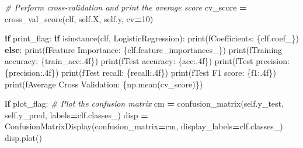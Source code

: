 \documentclass[
]{book}
\newenvironment{Shaded}{\begin{snugshade}}{\end{snugshade}}
\newcommand{\BuiltInTok}[1]{#1}
\newcommand{\CommentTok}[1]{\textcolor[rgb]{0.56,0.35,0.01}{\textit{#1}}}
\newcommand{\ControlFlowTok}[1]{\textcolor[rgb]{0.13,0.29,0.53}{\textbf{#1}}}
\newcommand{\DecValTok}[1]{\textcolor[rgb]{0.00,0.00,0.81}{#1}}
\newcommand{\NormalTok}[1]{#1}
\newcommand{\OperatorTok}[1]{\textcolor[rgb]{0.81,0.36,0.00}{\textbf{#1}}}
\newcommand{\SpecialCharTok}[1]{\textcolor[rgb]{0.00,0.00,0.00}{#1}}
\newcommand{\SpecialStringTok}[1]{\textcolor[rgb]{0.31,0.60,0.02}{#1}}
\newcommand{\VariableTok}[1]{\textcolor[rgb]{0.00,0.00,0.00}{#1}}
\theoremstyle{definition}
\theoremstyle{definition}
\theoremstyle{definition}
\theoremstyle{definition}
\theoremstyle{remark}
\begin{document}
\begin{Shaded}
\begin{Highlighting}[]
        \CommentTok{\# Perform cross{-}validation and print the average score}
\NormalTok{        cv\_score }\OperatorTok{=}\NormalTok{ cross\_val\_score(clf, }\VariableTok{self}\NormalTok{.X, }\VariableTok{self}\NormalTok{.y, cv}\OperatorTok{=}\DecValTok{10}\NormalTok{)}

        \ControlFlowTok{if}\NormalTok{ print\_flag:}
            \ControlFlowTok{if} \BuiltInTok{isinstance}\NormalTok{(clf, LogisticRegression):}
                \BuiltInTok{print}\NormalTok{(}\SpecialStringTok{f\textquotesingle{}Coefficients: }\SpecialCharTok{\{}\NormalTok{clf}\SpecialCharTok{.}\NormalTok{coef\_}\SpecialCharTok{\}}\SpecialStringTok{\textquotesingle{}}\NormalTok{)}
            \ControlFlowTok{else}\NormalTok{:}
                \BuiltInTok{print}\NormalTok{(}\SpecialStringTok{f\textquotesingle{}Feature Importance: }\SpecialCharTok{\{}\NormalTok{clf}\SpecialCharTok{.}\NormalTok{feature\_importances\_}\SpecialCharTok{\}}\SpecialStringTok{\textquotesingle{}}\NormalTok{)}
            \BuiltInTok{print}\NormalTok{(}\SpecialStringTok{f\textquotesingle{}Training accuracy: }\SpecialCharTok{\{}\NormalTok{train\_acc}\SpecialCharTok{:.4f\}}\SpecialStringTok{\textquotesingle{}}\NormalTok{)}
            \BuiltInTok{print}\NormalTok{(}\SpecialStringTok{f\textquotesingle{}Test accuracy: }\SpecialCharTok{\{}\NormalTok{acc}\SpecialCharTok{:.4f\}}\SpecialStringTok{\textquotesingle{}}\NormalTok{)}
            \BuiltInTok{print}\NormalTok{(}\SpecialStringTok{f\textquotesingle{}Test precision: }\SpecialCharTok{\{}\NormalTok{precision}\SpecialCharTok{:.4f\}}\SpecialStringTok{\textquotesingle{}}\NormalTok{)}
            \BuiltInTok{print}\NormalTok{(}\SpecialStringTok{f\textquotesingle{}Test recall: }\SpecialCharTok{\{}\NormalTok{recall}\SpecialCharTok{:.4f\}}\SpecialStringTok{\textquotesingle{}}\NormalTok{)}
            \BuiltInTok{print}\NormalTok{(}\SpecialStringTok{f\textquotesingle{}Test F1 score: }\SpecialCharTok{\{}\NormalTok{f1}\SpecialCharTok{:.4f\}}\SpecialStringTok{\textquotesingle{}}\NormalTok{)}
            \BuiltInTok{print}\NormalTok{(}\SpecialStringTok{f\textquotesingle{}Average Cross Validation: }\SpecialCharTok{\{}\NormalTok{np}\SpecialCharTok{.}\NormalTok{mean(cv\_score)}\SpecialCharTok{\}}\SpecialStringTok{\textquotesingle{}}\NormalTok{)}

        \ControlFlowTok{if}\NormalTok{ plot\_flag:}
            \CommentTok{\# Plot the confusion matrix}
\NormalTok{            cm }\OperatorTok{=}\NormalTok{ confusion\_matrix(}\VariableTok{self}\NormalTok{.y\_test, }\VariableTok{self}\NormalTok{.y\_pred, labels}\OperatorTok{=}\NormalTok{clf.classes\_)}
\NormalTok{            disp }\OperatorTok{=}\NormalTok{ ConfusionMatrixDisplay(confusion\_matrix}\OperatorTok{=}\NormalTok{cm, display\_labels}\OperatorTok{=}\NormalTok{clf.classes\_)}
\NormalTok{            disp.plot()}


\end{Highlighting}
\end{Shaded}
\end{document}

